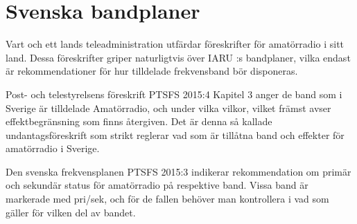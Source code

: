 \chapter{Svenska bandplaner}
\label{svenska bandplaner}

Vart och ett lands teleadministration utfärdar föreskrifter för amatörradio
i sitt land.
Dessa föreskrifter griper naturligtvis över IARU :s bandplaner, vilka endast
är rekommendationer för hur tilldelade frekvensband bör disponeras.

Post- och telestyrelsens föreskrift PTSFS 2015:4 \cite{PTSFS2015:4} Kapitel 3
anger de band som i Sverige är tilldelade Amatörradio, och under vilka
vilkor, vilket främst avser effektbegränsning som finns återgiven.
Det är denna så kallade undantagsföreskrift som strikt reglerar vad som är
tillåtna band och effekter för amatörradio i Sverige.

Den svenska frekvensplanen PTSFS 2015:3 \cite{PTSFS2015:3} indikerar
rekommendation om primär och sekundär status för amatörradio på respektive
band.
Vissa band är markerade med pri/sek, och för de fallen behöver man
kontrollera i \cite{PTSFS2015:3} vad som gäller för vilken del av bandet.

